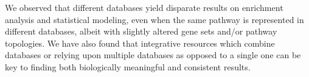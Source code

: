 We observed that different databases yield disparate results on enrichment analysis and statistical modeling, even when the same pathway is represented in different databases, albeit with slightly altered gene sets and/or pathway topologies. We have also found that integrative resources which combine databases or relying upon multiple databases as opposed to a single one can be key to finding both biologically meaningful and consistent results. 
